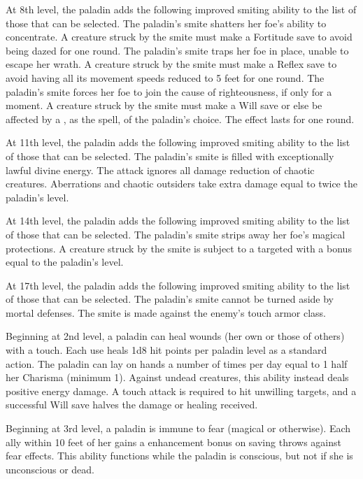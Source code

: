 At 8th level, the paladin adds the following improved smiting ability to the list of those that can be selected.
 The paladin's smite shatters her foe's ability to concentrate. A creature struck by the smite must make a Fortitude save to avoid being dazed for one round.
 The paladin's smite traps her foe in place, unable to escape her wrath. A creature struck by the smite must make a Reflex save to avoid having all its movement speeds reduced to 5 feet for one round.
 The paladin's smite forces her foe to join the cause of righteousness, if only for a moment. A creature struck by the smite must make a Will save or else be affected by a , as the spell, of the paladin's choice. The effect lasts for one round.

At 11th level, the paladin adds the following improved smiting ability to the list of those that can be selected.
 The paladin's smite is filled with exceptionally lawful divine energy. The attack ignores all damage reduction of chaotic creatures. Aberrations and chaotic outsiders take extra damage equal to twice the paladin's level.

At 14th level, the paladin adds the following improved smiting ability to the list of those that can be selected.
 The paladin's smite strips away her foe's magical protections. A creature struck by the smite is subject to a targeted  with a bonus equal to the paladin's level.

At 17th level, the paladin adds the following improved smiting ability to the list of those that can be selected.
 The paladin's smite cannot be turned aside by mortal defenses. The smite is made against the enemy's touch armor class.

 Beginning at 2nd level, a paladin can heal wounds (her own or those of others) with a touch. Each use heals 1d8 hit points per paladin level as a standard action. The paladin can lay on hands a number of times per day equal to 1 \add half her Charisma (minimum 1). Against undead creatures, this ability instead deals positive energy damage. A touch attack is required to hit unwilling targets, and a successful Will save halves the damage or healing received.

    Beginning at 3rd level, a paladin is immune to fear (magical or otherwise). Each ally within 10 feet of her gains a  enhancement bonus on saving throws against fear effects. This ability functions while the paladin is conscious, but not if she is unconscious or dead.


